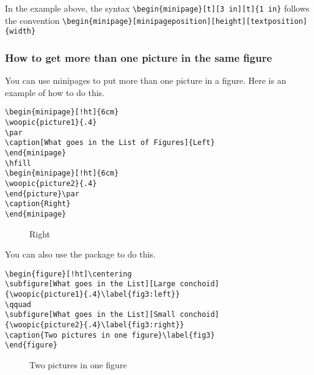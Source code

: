 In the example above, the syntax \verb|\begin{minipage}[t][3 in][t]{1 in}| follows the convention \linebreak\verb|\begin{minipage}[minipageposition][height][textposition]{width}|

\subsubsection[Two pictures in one figure]{How to get more than one picture in the same figure}

You can use minipages to put more than one picture in a figure. Here is an example of how to do this.
\begin{singlespace}\small
\begin{verbatim}
\begin{minipage}[!ht]{6cm}
\woopic{picture1}{.4}
\par
\caption[What goes in the List of Figures]{Left}
\end{minipage}
\hfill
\begin{minipage}[!ht]{6cm}
\woopic{picture2}{.4}
\end{picture}\par
\caption{Right}
\end{minipage}
\end{verbatim}
\end{singlespace}
\begin{figure}[!ht]
\begin{minipage}[!ht]{6cm}
\par
\caption[What goes in the List of Figures]{Left}
\end{minipage}
\hfill
\begin{minipage}[!ht]{6cm}
\par
\caption{Right}
\end{minipage}
\end{figure}

You can also use the  package to do this.

\begin{singlespace}\small
\begin{verbatim}
\begin{figure}[!ht]\centering
\subfigure[What goes in the List][Large conchoid]
{\woopic{picture1}{.4}\label{fig3:left}}
\qquad
\subfigure[What goes in the List][Small conchoid]
{\woopic{picture2}{.4}\label{fig3:right}}
\caption{Two pictures in one figure}\label{fig3}
\end{figure}
\end{verbatim}
\end{singlespace}
\begin{figure}[!ht]\centering
{}
\qquad
{}
\caption{Two pictures in one figure}\label{fig3}
\end{figure}

